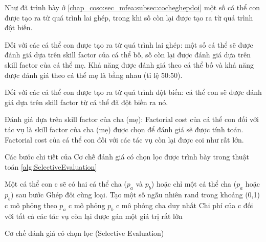 Như đã trình bày ở \ref{chap_coso:sec_mfea:subsec:cocheghepdoi} một số cá thể con được tạo ra từ quá trình lai ghép, trong khi số còn lại được tạo ra từ quá trình đột biến.

Đối với các cá thể con được tạo ra từ quá trình lai ghép: một số cá thể sẽ được đánh giá dựa trên skill factor của cá thể bố, số còn lại được đánh giá dựa trên skill factor của cá thể mẹ. Khả năng được đánh giá theo cá thể bố và khả năng được đánh giá theo cá thể mẹ là bằng nhau (tỉ lệ 50:50).

Đối với các cá thể con được tạo ra từ quá trình đột biến: cá thể con sẽ được đánh giá dựa trên skill factor từ cá thể đã đột biến ra nó.

Đánh giá dựa trên skill factor của cha (mẹ): Factorial cost của cá thể con đối với tác vụ là skill factor của cha (mẹ) được chọn để đánh giá sẽ được tính toán. Factorial cost của cá thể con đối với các tác vụ còn lại được coi như rất lớn.

Các bước chi tiết của Cơ chế đánh giá có chọn lọc được trình bày trong thuật toán \ref{alg:SelectiveEvaluation}
\begin{algorithm}[htb]
	Một cá thể con c sẽ có hai cá thể cha ($p_a$ và $p_b$) hoặc chỉ một cá thể cha ($p_a$ hoặc $p_b$) sau bước Ghép đôi cùng loại.\;
	\Begin
	{			
		{
			Tạo một số ngẫu nhiên rand trong khoảng (0,1)\;
			{
				c mô phỏng theo $p_a$\; 
			}
			\Else
			{
				c mô phỏng $p_b$\;
			}
		}
		\Else
		{
			c mô phỏng cha duy nhất\;
		}
		Chi phí của c đối với tất cả các tác vụ còn lại được gán một giá trị rất lớn\;
	}
	\caption{Cơ chế đánh giá có chọn lọc (Selective Evaluation)}
	\label{alg:SelectiveEvaluation}
\end{algorithm}

